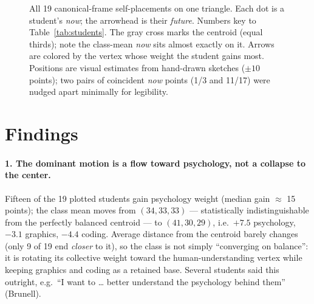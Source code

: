 \documentclass[11pt]{article}
\begin{document}
\begin{figure}[htbp]
\caption{All 19 canonical-frame self-placements on one triangle. Each dot is a
student's \emph{now}; the arrowhead is their \emph{future}. Numbers key to
Table~\ref{tab:students}. The gray cross marks the centroid (equal thirds);
note the class-mean \emph{now} sits almost exactly on it. Arrows are colored by
the vertex whose weight the student gains most. Positions are visual estimates
from hand-drawn sketches ($\pm 10$ points); two pairs of coincident \emph{now} points (1/3 and 11/17)
were nudged apart minimally for legibility.}
\label{fig:agg}
\end{figure}

\section*{Findings}

\paragraph{1. The dominant motion is a flow toward psychology, not a collapse
to the center.} Fifteen of the 19 plotted students gain psychology weight
(median gain $\approx$ 15 points); the class mean moves from
$(34,33,33)$ --- statistically indistinguishable from the perfectly balanced
centroid --- to $(41,30,29)$, i.e.\ $+7.5$ psychology, $-3.1$ graphics,
$-4.4$ coding. Average distance from the centroid barely changes
(only 9 of 19 end \emph{closer} to it), so the class is not simply
``converging on balance'': it is rotating its collective weight toward the
human-understanding vertex while keeping graphics and coding as a retained base.
Several students said this outright, e.g.\ ``I want to \ldots{} better
understand the psychology behind them'' (Brunell).
\end{document}
